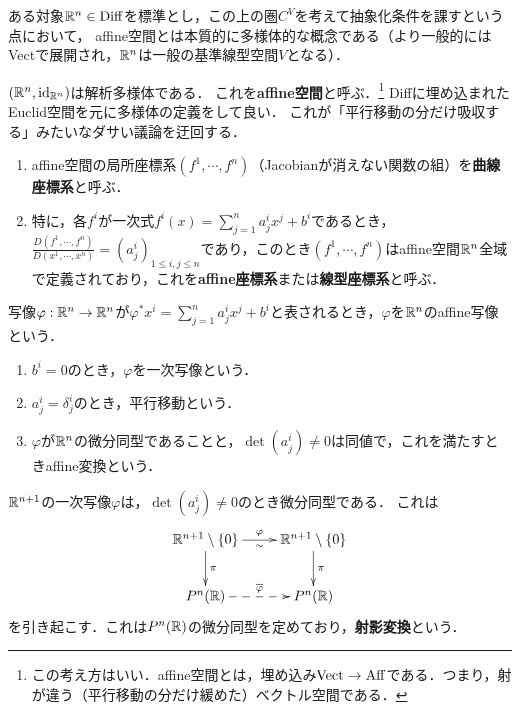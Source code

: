 \documentclass[uplatex,dvipdfmx]{jsreport}
\begin{document}
\begin{tcolorbox}[colframe=ForestGreen, colback=ForestGreen!10!white,breakable,colbacktitle=ForestGreen!40!white,coltitle=black,fonttitle=\bfseries\sffamily,
title=]
    ある対象$\mathbb{R}^n\in\mathrm{Diff}$を標準とし，この上の圏$C^V$を考えて抽象化条件を課すという点において，
    affine空間とは本質的に多様体的な概念である（より一般的にはVectで展開され，$\mathbb{R}^n$は一般の基準線型空間$V$となる）．
\end{tcolorbox}

\begin{example}
    $(\mathbb{R}^n,\mathrm{id}_{\mathbb{R}^n})$は解析多様体である．
    これを\textbf{affine空間}と呼ぶ．\footnote{この考え方はいい．affine空間とは，埋め込み$\mathrm{Vect}\to\mathrm{Aff}$である．つまり，射が違う（平行移動の分だけ緩めた）ベクトル空間である．}
    Diffに埋め込まれたEuclid空間を元に多様体の定義をして良い．
    これが「平行移動の分だけ吸収する」みたいなダサい議論を迂回する．
\end{example}

\begin{definition}[affine空間の座標]\mbox{}
    \begin{enumerate}
        \item affine空間の局所座標系$(f^1,\cdots,f^n)$（Jacobianが消えない関数の組）を\textbf{曲線座標系}と呼ぶ．
        \item 特に，各$f^i$が一次式$f^i(x)=\sum^n_{j=1}a^i_jx^j+b^i$であるとき，$\frac{D(f^1,\cdots,f^n)}{D(x^1,\cdots,x^n)}=(a^i_j)_{1\le i,j\le n}$であり，このとき$(f^1,\cdots,f^n)$はaffine空間$\mathbb{R}^n$全域で定義されており，これを\textbf{affine座標系}または\textbf{線型座標系}と呼ぶ．
    \end{enumerate}
\end{definition}

\begin{definition}[affine空間の射と同型]
    写像$\varphi:\mathbb{R}^n\to\mathbb{R}^n$が$\varphi^*x^i=\sum^n_{j=1}a^i_jx^j+b^i$と表されるとき，$\varphi$を$\mathbb{R}^n$のaffine写像という．
    \begin{enumerate}
        \item $b^i=0$のとき，$\varphi$を一次写像という．
        \item $a^i_j=\delta^i_j$のとき，平行移動という．
        \item $\varphi$が$\mathbb{R}^n$の微分同型であることと，$\det(a^i_j)\ne 0$は同値で，これを満たすときaffine変換という．
    \end{enumerate}
\end{definition}

\begin{definition}[射影空間の同型]
    $\mathbb{R}^{n+1}$の一次写像$\varphi$は，$\det(a^i_j)\ne 0$のとき微分同型である．
    これは
    \[\xymatrix{
        \R^{n+1}\setminus\{0\}\ar[r]^-\varphi_\sim\ar[d]^-{\pi}&\R^{n+1}\setminus\{0\}\ar[d]^-\pi\\
        P^n(\R)\ar@{-->}[r]^-{\o{\varphi}}&P^n(\R)
    }\]
    を引き起こす．これは$P^n(\mathbb{R})$の微分同型を定めており，\textbf{射影変換}という．
\end{definition}
\end{document}
